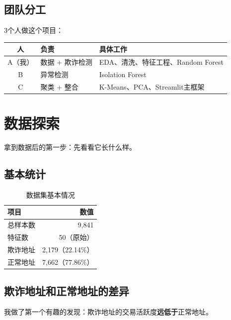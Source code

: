 \documentclass[12pt,a4paper]{article}
\begin{document}
\subsection{团队分工}

3个人做这个项目：

\begin{table}[H]
\centering
\begin{tabular}{@{}clp{5.5cm}@{}}
\toprule
\textbf{人} & \textbf{负责} & \textbf{具体工作} \\
\midrule
A（我） & 数据 + 欺诈检测 & EDA、清洗、特征工程、Random Forest \\
B & 异常检测 & Isolation Forest \\
C & 聚类 + 整合 & K-Means、PCA、Streamlit主框架 \\
\bottomrule
\end{tabular}
\end{table}

\section{数据探索}

拿到数据后的第一步：先看看它长什么样。

\subsection{基本统计}

\begin{table}[H]
\centering
\caption{数据集基本情况}
\begin{tabular}{@{}lr@{}}
\toprule
\textbf{项目} & \textbf{数值} \\
\midrule
总样本数 & 9,841 \\
特征数 & 50（原始） \\
欺诈地址 & 2,179（22.14\%） \\
正常地址 & 7,662（77.86\%） \\
\bottomrule
\end{tabular}
\end{table}

\subsection{欺诈地址和正常地址的差异}

我做了第一个有趣的发现：欺诈地址的交易活跃度\textbf{远低于}正常地址。
\end{document}
